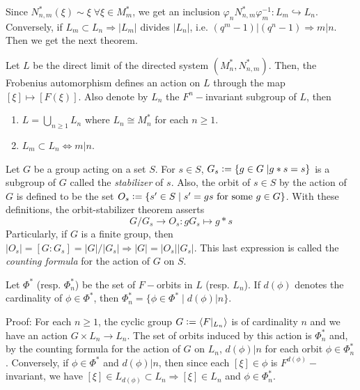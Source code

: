 \begin{center}
\end{center}
Since $N_{n,m}^*(\xi)\sim\xi\;\forall\xi\in M_m^*$, we get an inclusion $\varphi_n N_{n,m}^*\varphi_m^{-1}:L_m\hookrightarrow L_n$. Conversely, if $L_m\subset L_n\Rightarrow |L_m|$ divides $|L_n|$, i.e. $(q^{m}-1)|(q^{n}-1)\Rightarrow m|n$. Then we get the next theorem.
\begin{dang}
    \begin{theorem}\label{Theorem: definition of L and its characterization of orbits}\cite{macdonald1998symmetric}
        Let $L$ be the direct limit of the directed system $(M_n^*,N_{n,m}^*)$. Then, the Frobenius automorphism defines an action on $L$ through the map $[\xi]\mapsto [F(\xi)]$. Also denote by $L_n$  the $F^n-$invariant subgroup of $L$, then
        \begin{enumerate}
            \item[(1)]$L=\bigcup_{n\geq1}L_n$ where $L_n\cong M_n^*$ for each $n\geq1$.
            \item[(2)] $L_m\subset L_n\iff m|n$.    
        \end{enumerate}
    \end{theorem}
\end{dang}
Let $G$ be a group acting on a set $S$. For $s\in S$, $G_s\bydef\{g\in G\;| g*s=s\}$ is a subgroup of $G$ called the \textit{stabilizer} of $s$. Also, the orbit of $s\in S$ by the action of $G$ is defined to be the set $O_s\bydef\{s^\prime\in S\;|\;s^\prime=gs\text{ for some }g\in G\}$. With these definitions, the orbit-stabilizer theorem asserts
\begin{equation}
    G/G_s\rightarrow O_s: gG_s\mapsto g*s
\end{equation}
Particularly, if $G$ is a finite group, then $|O_s|=[G:G_s]=|G|/|G_s|\Rightarrow |G|=|O_s||G_s|$. This last expression is called the \textit{counting formula} for the action of $G$ on $S$.
\begin{dang}
    \begin{theorem}\cite{macdonald1998symmetric}
    Let $\Phi^*$ (resp. $\Phi_n^*$) be the set of $F-$orbits in $L$ (resp. $L_n$). If $d(\phi)$ denotes the cardinality of $\phi\in\Phi^*$, then $\Phi_n^*=\{\phi\in\Phi^*\;|\;d(\phi)|n\}$.
    \end{theorem}
\end{dang}
Proof: For each $n\geq1$, the cyclic group $G\bydef\langle F|_{L_n}\rangle$ is of cardinality $n$ and we have an action $G\times L_n\rightarrow L_n$. The set of orbits induced by this action is $\Phi_n^*$ and, by the counting formula for the action of $G$ on $L_n$, $d(\phi)|n$ for each orbit $\phi\in\Phi_n^*$. Conversely, if $\phi\in\Phi^*$ and $d(\phi)|n$, then since each $[\xi]\in\phi$ is $F^{d(\phi)}-$invariant, we have $[\xi]\in L_{d(\phi)}\subset L_n\Rightarrow [\xi]\in L_n$ and $\phi\in\Phi_n^*$.


